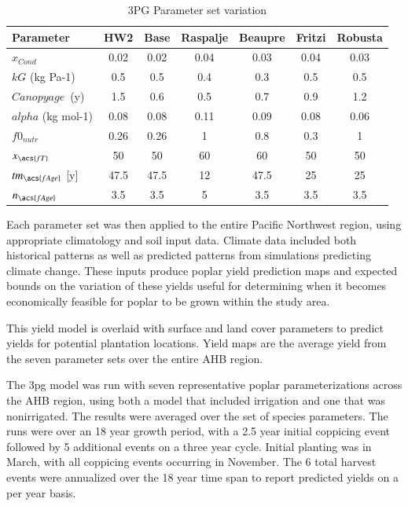 \documentclass[preprint,12pt]{elsarticle}
\begin{document}
\begin{table}%
\caption{3PG Parameter set variation}
\begin{tabularx}{\linewidth}{|X|c|c|c|c|c|c|}
\hline
 Parameter & HW2 & Base & Raspalje & Beaupre & Fritzi & Robusta\\
  \hline   
  $x_{Cond}$  & 0.02 & 0.02 & 0.04 & 0.03 & 0.04 & 0.03 \\
  $kG$ (kg Pa-1) & 0.5 & 0.5 & 0.4 & 0.3 & 0.5 & 0.5 \\
  $Canopy age$~(y) & 1.5 & 0.6 & 0.5 & 0.7 & 0.9 & 1.2 \\
  $alpha$ (kg mol-1) & 0.08 & 0.08 & 0.11 & 0.09 & 0.08 & 0.06 \\
  $f0_{nutr}$  & 0.26 & 0.26 & 1 & 0.8 & 0.3 & 1 \\
  $x_{\acs{fT}}$ & 50 & 50 & 60 & 60 & 50 & 50 \\
  $tm_{\acs{fAge}}$ [y] & 47.5 & 47.5 & 12 & 47.5 & 25  & 25 \\
  $n_{\acs{fAge}}$ & 3.5 & 3.5 & 5 & 3.5 & 3.5 & 3.5 \\
  \hline
\end{tabularx}
\label{tab:3pg-tree-parameters-vary}
 \end{table}

 Each parameter set was then applied to the entire Pacific Northwest
 region, using appropriate climatology and soil input data.  Climate
 data included both historical patterns as well as predicted patterns
 from simulations predicting climate change.  These inputs produce
 poplar yield prediction maps and expected bounds on the variation of
 these yields useful for determining when it becomes economically
 feasible for poplar to be grown within the study area.

This yield model is overlaid with surface and land cover
parameters to predict yields for potential plantation locations.
Yield maps are the average yield from the seven parameter sets over the
entire \ac{AHB} region. 

The \ac{3pg} model was run with seven representative poplar
parameterizations across the \ac{AHB} region, using both a
model that included irrigation and one that was nonirrigated.  The
results were averaged over the set of species parameters.  The runs
were over an 18 year growth period, with a 2.5 year initial coppicing
event followed by 5 additional events on a three year cycle.  Initial
planting was in March, with all coppicing events occurring in
November.  The 6 total harvest events were annualized over the 18 year
time span to report predicted yields on a per year basis.
\end{document}
